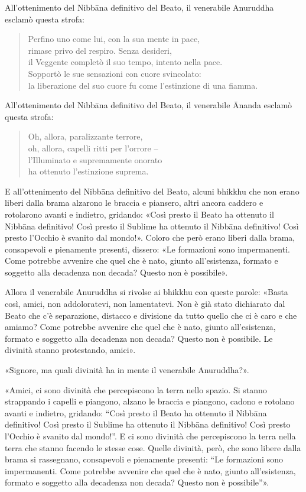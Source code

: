 All’ottenimento del Nibbāna definitivo del Beato, il venerabile
Anuruddha esclamò questa strofa:


\begin{quote}
Perfino uno come lui, con la sua mente in pace, \\
rimase privo del respiro. Senza desideri, \\
il Veggente completò il suo tempo, intento nella pace. \\
Sopportò le sue sensazioni con cuore svincolato: \\
la liberazione del suo cuore fu come l’estinzione di una fiamma.
\end{quote}

All’ottenimento del Nibbāna definitivo del Beato, il venerabile Ānanda
esclamò questa strofa:


\begin{quote}
Oh, allora, paralizzante terrore, \\
oh, allora, capelli ritti per l’orrore – \\
l’Illuminato e supremamente onorato \\
ha ottenuto l’estinzione suprema.
\end{quote}



E all’ottenimento del Nibbāna definitivo del Beato, alcuni bhikkhu che
non erano liberi dalla brama alzarono le braccia e piansero, altri
ancora caddero e rotolarono avanti e indietro, gridando: «Così presto il
Beato ha ottenuto il Nibbāna definitivo! Così presto il Sublime ha
ottenuto il Nibbāna definitivo! Così presto l’Occhio è svanito dal
mondo!». Coloro che però erano liberi dalla brama, consapevoli e
pienamente presenti, dissero: «Le formazioni sono impermanenti. Come
potrebbe avvenire che quel che è nato, giunto all’esistenza, formato e
soggetto alla decadenza non decada? Questo non è possibile».


Allora il venerabile Anuruddha si rivolse ai bhikkhu con queste parole:
«Basta così, amici, non addoloratevi, non lamentatevi. Non è già stato
dichiarato dal Beato che c’è separazione, distacco e divisione da tutto
quello che ci è caro e che amiamo? Come potrebbe avvenire che quel che è
nato, giunto all’esistenza, formato e soggetto alla decadenza non
decada? Questo non è possibile. Le divinità stanno protestando, amici».


«Signore, ma quali divinità ha in mente il venerabile Anuruddha?».


«Amici, ci sono divinità che percepiscono la terra nello spazio. Si
stanno strappando i capelli e piangono, alzano le braccia e piangono,
cadono e rotolano avanti e indietro, gridando: “Così presto il Beato ha
ottenuto il Nibbāna definitivo! Così presto il Sublime ha ottenuto il
Nibbāna definitivo! Così presto l’Occhio è svanito dal mondo!”. E ci
sono divinità che percepiscono la terra nella terra che stanno facendo
le stesse cose. Quelle divinità, però, che sono libere dalla brama si
rassegnano, consapevoli e pienamente presenti: “Le formazioni sono
impermanenti. Come potrebbe avvenire che quel che è nato, giunto
all’esistenza, formato e soggetto alla decadenza non decada? Questo non
è possibile”».



